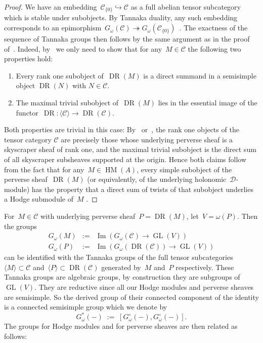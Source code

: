 \documentclass[a4paper]{amsart}
\newcommand{\cC}{\mathcal{C}}
\newcommand{\cD}{\mathcal{D}}
\DeclareMathOperator{\im}{Im}
\DeclareMathOperator{\GL}{GL}
\DeclareMathOperator{\DR}{DR}
\DeclareMathOperator{\HM}{HM}
\theoremstyle{plain}
\theoremstyle{definition}
\numberwithin{equation}{section}
\begin{document}
\begin{proof} 
We have an embedding~$\cC_{\{0\}}\hookrightarrow \cC$ as a full abelian tensor subcategory which is stable under subobjects. By Tannaka duality, any such embedding corresponds to an epimorphism~$G_\omega(\cC)\twoheadrightarrow G_\omega(\cC_{\{0\}})$~\cite[prop.~2.21a]{DM82}. The exactness of the sequence of Tannaka groups then follows by the same argument as in the proof of~\cite[th.~4.3]{JKLM}. Indeed, by~\cite[prop.~A.13 and lemma A.4(1)]{DAE20} we only need to show that for any~$M\in \cC$ the following two properties hold:\smallskip
%
\begin{enumerate} 
\item Every rank one subobject of~$\DR(M)$ is a direct summand in a semisimple object $\DR(N)$ with $N\in \cC$.\smallskip
\item The maximal trivial subobject of~$\DR(M)$ lies in the essential image of the functor~$\DR\colon \langle \cC \rangle \to \DR(\cC)$.\smallskip
\end{enumerate} 
%
Both properties are trivial in this case: By~\cite[sect.~10]{WeissauerAlmostConnected} or~\cite[lemma~3.5]{KraemerMicrolocalI}, the rank one objects of the tensor category $\cC$ are precisely those whose underlying perverse sheaf is a skyscraper sheaf of rank one,
and the maximal trivial subobject is the direct sum of all skyscraper subsheaves supported at the origin. Hence both claims follow from the fact that for any~$M\in \HM(A)$, every simple subobject of the perverse sheaf~$\DR(M)$ (or equivalently, of the underlying holonomic~$\cD$-module) has the property that a direct sum of twists of that subobject underlies a Hodge submodule of~$M$ \cite[prop.~16.3.1]{MHMProject}.
%
\end{proof} 

For~$M\in \cC$ with underlying perverse sheaf~$P=\DR(M)$, let~$V=\omega(P)$. Then the groups
%
\begin{eqnarray*}
 G_\omega(M) &:=& \im(G_\omega(\cC) \to \GL(V)) \\
  G_\omega(P) &:=& \im(G_\omega(\DR(\cC)) \to \GL(V))  
\end{eqnarray*}
%
can be identified with the Tannaka groups of the full tensor subcategories~$\langle M \rangle \subset \cC$ and~$\langle P \rangle \subset \DR(\cC)$ generated by~$M$ and~$P$ respectively. These Tannaka groups are algebraic groups, by construction they are subgroups of~$\GL(V)$. They are  reductive since all our Hodge modules and perverse sheaves are semisimple. So the derived group of their connected component of the identity is a connected semisimple group which we denote by 
%
\[ 
G^*_\omega(-) \;:=\; [G^\circ_\omega(-), G^\circ_\omega(-)].
\] 
%
The groups for Hodge modules and for perverse sheaves are then related as follows:
\end{document}
